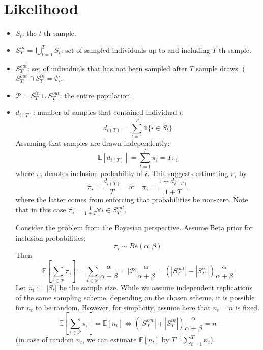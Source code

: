 \documentclass[a4paper, 12pt]{article}
\begin{document}
\section{Likelihood}
\begin{itemize}
    \item $S_t$: the $t$-th sample.
    \item $S_T^{in} = \bigcup \limits_{t=1}^{T} S_t$: set of sampled individuals up to and including $T$-th sample.
    \item $S_T^{out}$: set of individuals that has not been sampled after $T$ sample draws. ($S_T^{out} \cap S_T^{in} = \emptyset$).
    \item $\mathcal{P} = S_T^{in} \cup S_T^{out}$: the entire population.
    \item $d_{i(T)}$: number of samples that contained individual $i$:
    \begin{equation*}
        d_{i(T)} = \sum_{t=1}^T \mathds{1}\{i \in S_t \}
    \end{equation*}
    Assuming that samples are drawn independently:
    \begin{equation*}
        \mathbb{E}[d_{i(T)}] = \sum_{t = 1}^T \pi_i = T\pi_i
    \end{equation*}
    where $\pi_i$ denotes inclusion probability of $i$. This suggests estimating $\pi_i$ by
    \begin{equation} \label{eq:1}
        \hat{\pi}_i = \frac{d_{i(T)}}{T} \quad \text{or} \quad \hat{\pi}_i = \frac{1 + d_{i(T)}}{1 + T}
    \end{equation}
    where the latter comes from enforcing that probabilities be non-zero. Note that in this case $\hat{\pi_i} = \frac{1}{1 + T} \forall i \in S_T^{out}$.
    
    Consider the problem from the Bayesian perspective. Assume Beta prior for inclusion probabilities:
    \begin{equation*}
        \pi_i \sim Be(\alpha, \beta)
    \end{equation*}
    Then
    \begin{equation*}
        \mathbb{E}[\sum_{i \in \mathcal{P}} \pi_i] = \sum_{i \in \mathcal{P}} \frac{\alpha}{\alpha + \beta} = |\mathcal{P}| \frac{\alpha}{\alpha + \beta} = (|S_T^{out}| + |S_T^{in}|) \frac{\alpha}{\alpha + \beta}
    \end{equation*}
    Let $n_t := |S_t|$ be the sample size. While we assume independent replications of the same sampling scheme, depending on the chosen scheme, it is possible for $n_t$ to be random. However, for simplicity, assume here that $n_t = n$ is fixed.
    \begin{equation} \label{eq:2}
        \mathbb{E}[\sum_{i \in \mathcal{P}} \pi_i] = \mathbb{E}[n_t]
        \Leftrightarrow (|S_T^{out}| + |S_T^{in}|) \frac{\alpha}{\alpha + \beta} = n
    \end{equation}
    (in case of random $n_t$, we can estimate $\mathbb{E}[n_t]$ by $T^{-1} \sum_{t=1}^T n_t$).
    

\end{itemize}
\end{document}
